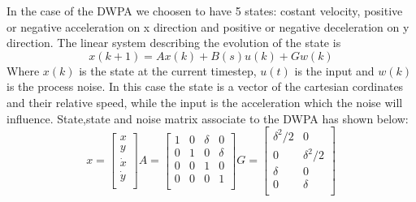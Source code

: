 \documentclass[twocolumn]{article}
\begin{document}
    In the case of the DWPA we choosen to have 5 states: costant velocity, positive or negative acceleration
    on x direction and positive or negative deceleration on y direction.
    The linear system describing the evolution of the state is 
    \begin{equation}
        x(k+1)= Ax(k) + B(s)u(k) + Gw(k)
    \end{equation}
    Where $x(k)$ is the state at the current timestep, $u(t)$ is the input and $w(k)$ is the process noise.
    In this case the state is a vector of the cartesian cordinates and their relative speed, while the input 
    is the acceleration which the noise will influence. 
    State,state and noise matrix associate to the DWPA has shown below:
    \[ x=\begin{bmatrix} x \\ y \\ \dot{x} \\ \dot{y} \\ \end{bmatrix}  A=\begin{bmatrix}
            1 & 0 & \delta & 0      \\
            0 & 1 & 0      & \delta \\
            0 & 0 & 1      & 0      \\
            0 & 0 & 0      & 1      \\
        \end{bmatrix}
        G=\begin{bmatrix}
            \delta^2/2 & 0          \\
            0          & \delta^2/2 \\
            \delta     & 0          \\
            0          & \delta     \\
        \end{bmatrix}
    \]
\end{document}

